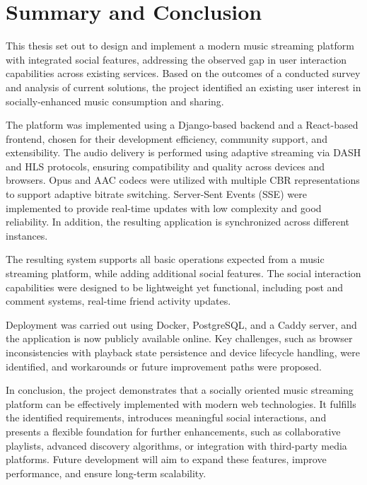 \chapter{Summary and Conclusion}\label{chap:conclusion}
This thesis set out to design and implement a modern music streaming platform
with integrated social features, addressing the observed gap
in user interaction capabilities across existing services. Based on the outcomes of
a conducted survey and analysis of current solutions, the project identified
an existing user interest in socially-enhanced music consumption and sharing.

The platform was implemented using a Django-based backend and a React-based frontend,
chosen for their development efficiency, community support, and extensibility.
The audio delivery is performed using adaptive streaming via DASH and HLS protocols,
ensuring compatibility and quality across devices and browsers.
Opus and AAC codecs were utilized with multiple CBR representations to support adaptive bitrate
switching. Server-Sent Events (SSE) were implemented to provide real-time
updates with low complexity and good reliability. In addition,
the resulting application is synchronized across different instances.

The resulting system supports all basic operations expected from a music streaming platform,
while adding additional social features.
The social interaction capabilities were designed to be lightweight yet functional,
including post and comment systems, real-time friend activity updates.

Deployment was carried out using Docker, PostgreSQL, and a Caddy server,
and the application is now publicly available online.
Key challenges, such as browser inconsistencies with playback state persistence
and device lifecycle handling, were identified, and workarounds
or future improvement paths were proposed.

In conclusion, the project demonstrates that a socially oriented music streaming
platform can be effectively implemented with modern web technologies.
It fulfills the identified requirements, introduces meaningful social
interactions, and presents a flexible foundation for further enhancements,
such as collaborative playlists, advanced discovery algorithms,
or integration with third-party media platforms.
Future development will aim to expand these features,
improve performance, and ensure long-term scalability.


